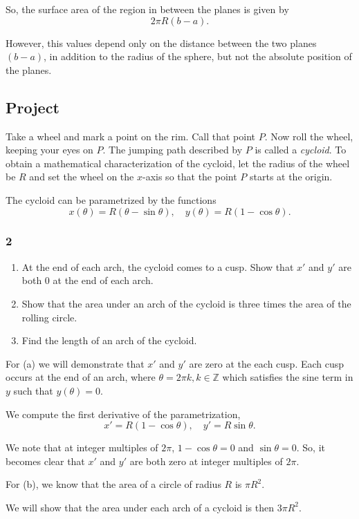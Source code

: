 \documentclass[../hw10]{subfiles}
\begin{document}
So, the surface area of the region in between the planes is given by \[2\pi R(b-a).\]

However, this values depend only on the distance between the two planes $(b-a)$, in addition to the radius of the sphere, but not the absolute position of the planes.


\subsection*{Project}
Take a wheel and mark a point on the rim. Call that point $P$. Now roll the wheel, keeping your eyes on $P$. The jumping path described by $P$ is called a \textit{cycloid}. To obtain a mathematical characterization of the cycloid, let the radius of the wheel be $R$ and set the wheel on the $x$-axis so that the point $P$ starts at the origin.

The cycloid can be parametrized by the functions
\[x(\theta)=R(\theta-\sin{\theta}), \quad y(\theta)=R(1-\cos{\theta}).\]

\subsubsection*{2}
\begin{enumerate}[label=\alph*.]
    \item At the end of each arch, the cycloid comes to a cusp. Show that $x'$ and $y'$ are both 0 at the end of each arch.
    \item Show that the area under an arch of the cycloid is three times the area of the rolling circle.
    \item Find the length of an arch of the cycloid.
\end{enumerate}

For (a) we will demonstrate that $x'$ and $y'$ are zero at the each cusp. Each cusp occurs at the end of an arch, where $\theta=2\pi k, k\in\mathbb{Z}$ which satisfies the sine term in $y$ such that $y(\theta)=0$.

We compute the first derivative of the parametrization, 
\[x'=R(1-\cos{\theta}), \quad y'=R\sin{\theta}.\]

We note that at integer multiples of $2\pi$, $1-\cos{\theta}=0$ and $\sin{\theta}=0$. So, it becomes clear that $x'$ and $y'$ are both zero at integer multiples of $2\pi$.

For (b), we know that the area of a circle of radius $R$ is $\pi R^2$. 

We will show that the area under each arch of a cycloid is then $3\pi R^2$.
\end{document}
